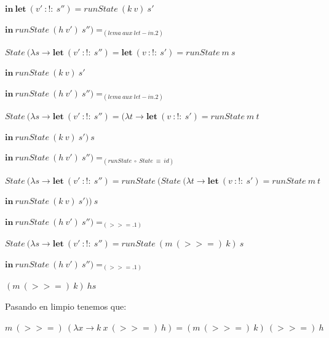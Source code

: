 \begin{flushleft}
    \hspace{25.5mm} $\textbf{in}\ \textbf{let}\ (v'\ :!:\ s'') = runState\ (k\ v)\ s'$
    
      \hspace{30.5mm} $\textbf{in}\ runState\ (h\ v')\ s'')=_{(lema\ aux\ let-in.2)}$


  \hspace{5mm} $State\ (\lambda s \rightarrow \textbf{let}\ (v'\ :!:\ s'') = \textbf{let}\ (v\ :!:\ s') = runState\ m\ s$

      \hspace{52.5mm} $\textbf{in}\ runState\ (k\ v)\ s'$

    \hspace{25.5mm} $\textbf{in}\ runState\ (h\ v')\ s'')=_{(lema\ aux\ let-in.2)}$\newpage

    
  \hspace{5mm} $State\ (\lambda s \rightarrow \textbf{let}\ (v'\ :!:\ s'') = (\lambda t\rightarrow \textbf{let}\ (v\ :!:\ s') = runState\ m\ t$

      \hspace{63mm} $\textbf{in}\ runState\ (k\ v)\ s')\ s$

    \hspace{25.5mm} $\textbf{in}\ runState\ (h\ v')\ s'')=_{(runState\ \circ\ State\ \equiv\ id)}$
      

  \hspace{5mm} $State\ (\lambda s \rightarrow \textbf{let}\ (v'\ :!:\ s'') = runState\ (State\ (\lambda t\rightarrow \textbf{let}\ (v\ :!:\ s') = runState\ m\ t$

      \hspace{89mm} $\textbf{in}\ runState\ (k\ v)\ s'))\ s$

    \hspace{25.5mm} $\textbf{in}\ runState\ (h\ v')\ s'')=_{(>>=.1)}$


  \hspace{5mm} $State\ (\lambda s \rightarrow \textbf{let}\ (v'\ :!:\ s'') = runState\ (m\ (>>=)\ k)\ s$

    \hspace{25.5mm} $\textbf{in}\ runState\ (h\ v')\ s'')=_{(>>=.1)}$


  \hspace{5mm} $(m\ (>>=)\ k)\ hs$\emptyline

Pasando en limpio tenemos que:

  \begin{center}
    $m\ (>>=)\ (\lambda x \rightarrow k\ x\ (>>=)\ h) = (m\ (>>=)\ k)\ (>>=)\ h$
  \end{center}


\end{flushleft}
